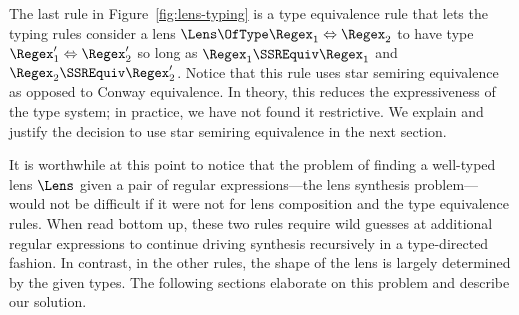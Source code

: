 \documentclass[acmsmall,screen]{acmart}
\begin{document}
The last rule in Figure~\ref{fig:lens-typing} is a type equivalence rule
that lets the typing rules consider a lens
$\Lens \OfType \Regex_1 \Leftrightarrow \Regex_2$ to have type
$\Regex_1' \Leftrightarrow \Regex_2'$ so long as
$\Regex_1 \SSREquiv \Regex_1$ and
$\Regex_2 \SSREquiv \Regex_2'$.  Notice that this rule uses star semiring equivalence
as opposed to Conway equivalence.  In theory, this reduces the expressiveness of the
type system; in practice, we have not found it restrictive.  We explain and
justify the decision to use star semiring equivalence in the next section.


It is worthwhile at this point to notice that the problem of
finding a well-typed lens $\Lens$ given a pair of regular
expressions---the lens synthesis problem---would not be difficult if
it were not for lens composition and the type equivalence rules.  When
read bottom up, these two rules require wild guesses at
additional regular expressions to continue driving synthesis
recursively in a type-directed fashion.  In contrast, in the other
rules, the shape of the lens is largely determined by the given types.
The following sections elaborate on this problem and describe our
solution.


\end{document}
